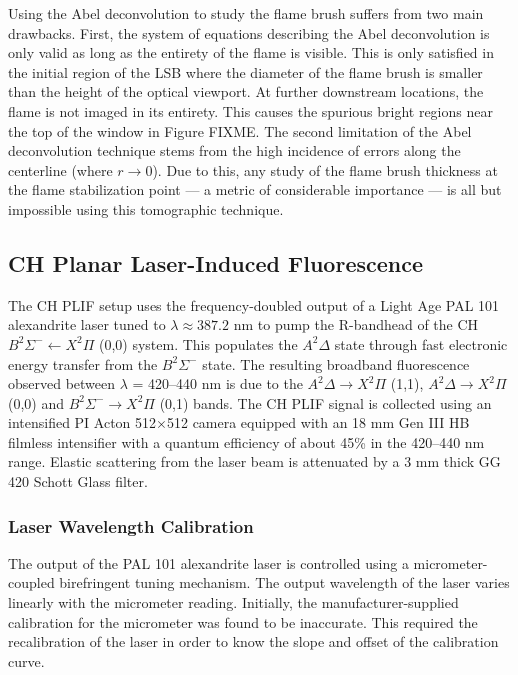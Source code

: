 Using the Abel deconvolution to study the flame brush suffers from two main drawbacks.
First, the system of equations describing the Abel deconvolution is only valid as long as the entirety of the flame is visible.
This is only satisfied in the initial region of the LSB where the diameter of the flame brush is smaller than the height of the optical viewport.
At further downstream locations, the flame is not imaged in its entirety.
This causes the spurious bright regions near the top of the window in Figure FIXME.
The second limitation of the Abel deconvolution technique stems from the high incidence of errors along the centerline (where \(r \to 0\)).
Due to this, any study of the flame brush thickness at the flame stabilization point --- a metric of considerable importance --- is all but impossible using this tomographic technique.

\subsection{CH Planar Laser-Induced Fluorescence}

The CH PLIF setup uses the frequency-doubled output of a Light Age PAL 101 alexandrite laser tuned to \(\lambda \approx 387.2\) nm to pump the R-bandhead of the CH \(B^2\Sigma^- \leftarrow X^2\Pi\) (0,0) system.
This populates the \(A^2\Delta\) state through fast electronic energy transfer from the \(B^2\Sigma^-\) state.
The resulting broadband fluorescence observed between \(\lambda\) = 420--440 nm is due to the \(A^2\Delta \rightarrow X^2\Pi\) (1,1), \(A^2\Delta \rightarrow X^2\Pi\) (0,0) and \(B^2\Sigma^- \rightarrow X^2\Pi\) (0,1) bands.
The CH PLIF signal is collected using an intensified PI Acton 512\(\times\)512 camera equipped with an 18 mm Gen III HB filmless intensifier with a quantum efficiency of about 45\% in the 420--440 nm range.
Elastic scattering from the laser beam is attenuated by a 3 mm thick GG 420 Schott Glass filter.

\subsubsection{Laser Wavelength Calibration}

The output of the PAL 101 alexandrite laser is controlled using a micrometer-coupled birefringent tuning mechanism.
The output wavelength of the laser varies linearly with the micrometer reading.
Initially, the manufacturer-supplied calibration for the micrometer was found to be inaccurate.
This required the recalibration of the laser in order to know the slope and offset of the calibration curve.

